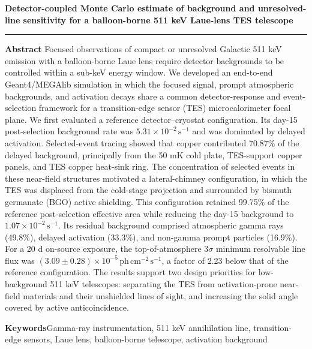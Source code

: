 \documentclass[11pt]{article}
\newcommand{\phcms}{\ensuremath{\,\mathrm{ph\,cm^{-2}\,s^{-1}}}}
\newcommand{\cps}{\ensuremath{\,\mathrm{s^{-1}}}}
\begin{document}
\thispagestyle{fancy}
\begin{flushleft}
{\LARGE\bfseries Detector-coupled Monte Carlo estimate of background and unresolved-line sensitivity for a balloon-borne 511 keV Laue-lens TES telescope\par}
\end{flushleft}
\vspace{0.7em}
\noindent\rule{\textwidth}{0.4pt}
\vspace{0.5em}

\noindent\textbf{Abstract}\hspace{0.7em}
Focused observations of compact or unresolved Galactic 511 keV emission with a
balloon-borne Laue lens require detector backgrounds to be controlled within a
sub-keV energy window. We developed an end-to-end Geant4/MEGAlib simulation in
which the focused signal, prompt atmospheric backgrounds, and activation decays
share a common detector-response and event-selection framework for a
transition-edge sensor (TES) microcalorimeter focal plane. We first evaluated a
reference detector--cryostat configuration. Its day-15 post-selection
background rate was $5.31\times10^{-2}\cps$ and was dominated by delayed
activation. Selected-event tracing showed that copper contributed 70.87\% of
the delayed background, principally from the 50 mK cold plate, TES-support
copper panels, and TES copper heat-sink ring. The concentration of selected
events in these near-field structures motivated a lateral-chimney
configuration, in which the TES was displaced from the
cold-stage projection and surrounded by bismuth germanate (BGO) active
shielding. This configuration retained 99.75\% of the reference post-selection
effective area while reducing the day-15 background to
$1.07\times10^{-2}\cps$. Its residual background comprised atmospheric
gamma rays (49.8\%), delayed activation (33.3\%), and non-gamma
prompt particles (16.9\%). For a 20 d on-source exposure, the top-of-atmosphere
$3\sigma$ minimum resolvable line flux was
$(3.09\pm0.28)\times10^{-5}\phcms$, a factor of 2.23 below that of the reference
configuration. The results support two design priorities for low-background
511 keV telescopes: separating the TES from activation-prone near-field
materials and their unshielded lines of sight, and increasing the solid angle
covered by active anticoincidence.

\vspace{0.7em}
\noindent\textbf{Keywords}\hspace{0.7em}Gamma-ray instrumentation, 511 keV annihilation line, transition-edge sensors, Laue lens, balloon-borne telescope, activation background
\end{document}
